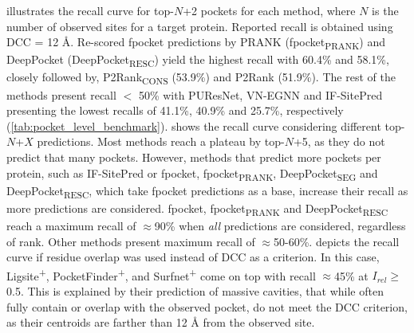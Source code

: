  illustrates the recall curve for top-$N$+2 pockets for each method, where $N$ is the number of observed sites for a target protein. Reported recall is obtained using DCC = 12 \AA{}. Re-scored fpocket predictions by PRANK (fpocket\textsubscript{PRANK}) and DeepPocket (DeepPocket\textsubscript{RESC}) yield the highest recall with 60.4\% and 58.1\%, closely followed by, P2Rank\textsubscript{CONS} (53.9\%) and P2Rank (51.9\%). The rest of the methods present recall $<$ 50\% with PUResNet, VN-EGNN and IF-SitePred presenting the lowest recalls of 41.1\%, 40.9\% and 25.7\%, respectively (\autoref{tab:pocket_level_benchmark}).  shows the recall curve considering different top-$N$+$X$ predictions. Most methods reach a plateau by top-$N$+5, as they do not predict that many pockets. However, methods that predict more pockets per protein, such as IF-SitePred or fpocket, fpocket\textsubscript{PRANK}, DeepPocket\textsubscript{SEG} and DeepPocket\textsubscript{RESC}, which take fpocket predictions as a base, increase their recall as more predictions are considered. fpocket, fpocket\textsubscript{PRANK} and DeepPocket\textsubscript{RESC} reach a maximum recall of $\approx$90\% when \textit{all} predictions are considered, regardless of rank. Other methods present maximum recall of $\approx$50-60\%.  depicts the recall curve if residue overlap was used instead of DCC as a criterion. In this case, Ligsite\textsuperscript{+}, PocketFinder\textsuperscript{+}, and Surfnet\textsuperscript{+} come on top with recall $\approx$45\% at $I_{rel} \geq$ 0.5. This is explained by their prediction of massive cavities, that while often fully contain or overlap with the observed pocket, do not meet the DCC criterion, as their centroids are farther than 12 \AA{} from the observed site.

